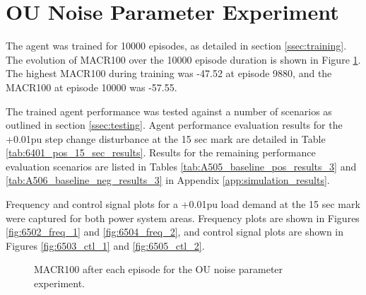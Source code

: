 \section{OU Noise Parameter Experiment}\label{sec:ou_noise}
The agent was trained for 10000 episodes, as detailed in section \ref{ssec:training}. The evolution of MACR100 over the 10000 episode duration is shown in Figure \ref{fig:6501_average_reward}. The highest MACR100 during training was -47.52 at episode 9880, and the MACR100 at episode 10000 was -57.55.

The trained agent performance was tested against a number of scenarios as outlined in section \ref{ssec:testing}. Agent performance evaluation results for the +0.01pu step change disturbance at the 15 sec mark are detailed in Table \ref{tab:6401_pos_15_sec_results}. Results for the remaining performance evaluation scenarios are listed in Tables \ref{tab:A505_baseline_pos_results_3} and \ref{tab:A506_baseline_neg_results_3} in Appendix \ref{app:simulation_results}.

Frequency and control signal plots for a +0.01pu load demand at the 15 sec mark were captured for both power system areas. Frequency plots are shown in Figures \ref{fig:6502_freq_1} and \ref{fig:6504_freq_2}, and control signal plots are shown in Figures \ref{fig:6503_ctl_1} and \ref{fig:6505_ctl_2}.

\begin{figure}[h]
	\centering
	
	\caption{MACR100 after each episode for the OU noise parameter experiment.}\label{fig:6501_average_reward}
\end{figure}




